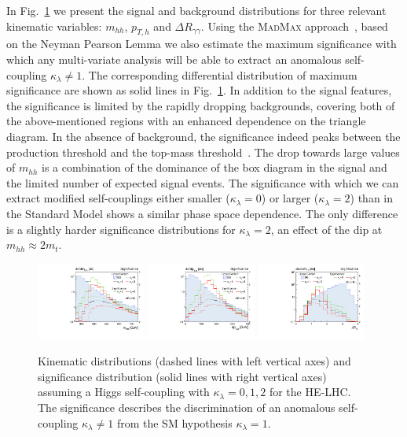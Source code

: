 In Fig.~\ref{fig:madmax_diff} we present the signal and background 
distributions for three relevant kinematic variables: $m_{hh}$, $p_{T,h}$
and $\Delta R_{\gamma\gamma}$. Using the \textsc{MadMax} 
approach~\cite{madmax}, based on the Neyman Pearson Lemma we 
also estimate the maximum significance with which any multi-variate 
analysis will be able to extract an anomalous self-coupling 
$\kappa_\lambda \neq1$. The corresponding differential distribution of 
maximum significance are shown as solid lines in Fig.~\ref{fig:madmax_diff}. 
In addition to the signal features, the significance is limited by the rapidly dropping 
backgrounds, covering both of the above-mentioned regions with an enhanced dependence 
on the triangle diagram. In the absence of background, the significance 
indeed peaks between the production threshold and the top-mass
threshold~\cite{madmax-hh}.  The drop towards large values of $m_{hh}$
is a combination of the dominance of the box diagram in the signal and
the limited number of expected signal events.  The significance with
which we can extract modified self-couplings either smaller
($\kappa_\lambda = 0$) or larger ($\kappa_\lambda = 2$) than in the
Standard Model shows a similar phase space dependence. The only
difference is a slightly harder significance distributions for
$\kappa_\lambda = 2$, an effect of the dip at
$m_{hh}\approx 2m_t$.

\begin{figure}[t]
  \includegraphics[width=0.32\textwidth]{section3/plots/Plot_mhh_27TeV}
  \includegraphics[width=0.32\textwidth]{section3/plots/Plot_pth_27TeV}
  \includegraphics[width=0.32\textwidth]{section3/plots/Plot_draa_27TeV}
  \caption{Kinematic distributions (dashed lines with left vertical
    axes) and significance distribution (solid lines with right
    vertical axes) assuming a Higgs self-coupling with
    $\kappa_\lambda=0,1,2$ for the HE-LHC. The significance describes the
    discrimination of an anomalous self-coupling $\kappa_\lambda \neq
    1$ from the SM hypothesis $\kappa_\lambda = 1$.}
\label{fig:madmax_diff}
\end{figure}

